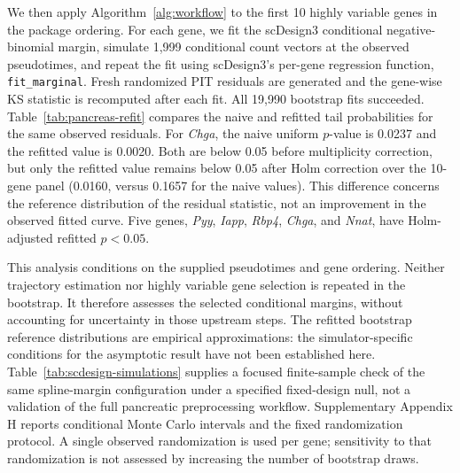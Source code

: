 \documentclass[preprint,12pt]{elsarticle}
\theoremstyle{plain}
\theoremstyle{remark}
\begin{document}
We then apply Algorithm~\ref{alg:workflow} to the first 10 highly variable
genes in the package ordering. For each gene, we fit the scDesign3 conditional
negative-binomial margin, simulate 1,999 conditional count vectors at the
observed pseudotimes, and repeat the fit using scDesign3's per-gene regression
function, \texttt{fit\_marginal}. Fresh randomized PIT residuals are generated
and the gene-wise KS statistic is recomputed after each fit. All 19,990
bootstrap fits succeeded. Table~\ref{tab:pancreas-refit} compares the naive
and refitted tail probabilities for the same observed residuals. For
\textit{Chga}, the naive uniform $p$-value is 0.0237 and the refitted value is
0.0020. Both are below 0.05 before multiplicity correction, but only the
refitted value remains below 0.05 after Holm correction over the 10-gene
panel (0.0160, versus 0.1657 for the naive values). This difference concerns
the reference distribution of the residual statistic, not an improvement in
the observed fitted curve. Five genes, \textit{Pyy}, \textit{Iapp},
\textit{Rbp4}, \textit{Chga}, and \textit{Nnat}, have Holm-adjusted refitted
$p<0.05$.

This analysis conditions on the supplied pseudotimes and gene ordering.
Neither trajectory estimation nor highly variable gene selection is repeated
in the bootstrap. It therefore assesses the selected conditional margins,
without accounting for uncertainty in those upstream steps. The refitted
bootstrap reference distributions are empirical approximations: the
simulator-specific conditions for the asymptotic result have not been
established here. Table~\ref{tab:scdesign-simulations} supplies a focused
finite-sample check of the same spline-margin configuration under a specified
fixed-design null, not a validation of the full pancreatic preprocessing
workflow. Supplementary Appendix H reports conditional Monte Carlo
intervals and the fixed randomization protocol. A single observed
randomization is used per gene; sensitivity to that randomization is not
assessed by increasing the number of bootstrap draws.
\end{document}
